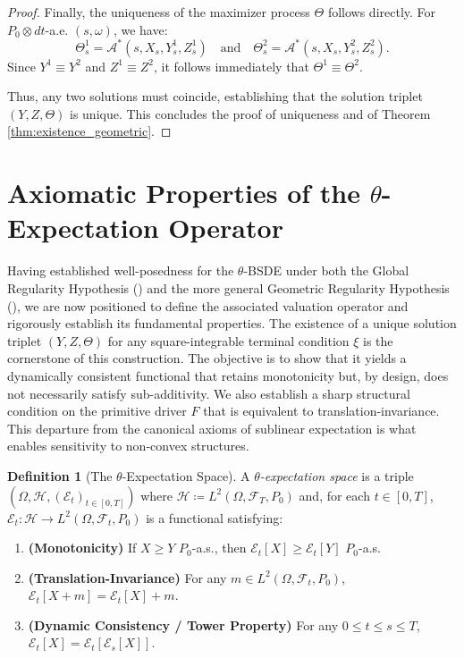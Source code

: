 \documentclass[12pt, letterpaper]{amsart}
\newcommand{\Ecal}{\mathcal{E}}
\newcommand{\Thetacal}{\mathcal{A}}
\theoremstyle{plain}
\theoremstyle{definition}
\newtheorem{definition}[theorem]{Definition}
\theoremstyle{remark}
\numberwithin{equation}{section} %
\begin{document}
\begin{proof}
Finally, the uniqueness of the maximizer process \(\Theta\) follows directly. For $P_0 \otimes dt$-a.e. $(s,\omega)$, we have:
\[ \Theta^1_s = \Thetacal^*(s,X_s,Y^1_s,Z^1_s) \quad \text{and} \quad \Theta^2_s = \Thetacal^*(s,X_s,Y^2_s,Z^2_s). \]
Since $Y^1 \equiv Y^2$ and $Z^1 \equiv Z^2$, it follows immediately that $\Theta^1 \equiv \Theta^2$.

Thus, any two solutions must coincide, establishing that the solution triplet \((Y, Z, \Theta)\) is unique. This concludes the proof of uniqueness and of Theorem \ref{thm:existence_geometric}.

\end{proof}

\section{Axiomatic Properties of the \texorpdfstring{$\theta$}{theta}-Expectation Operator}\label{sec:axiomatic_space}


Having established well-posedness for the $\theta$-BSDE under both the Global Regularity Hypothesis () and the more general Geometric Regularity Hypothesis (), we are now positioned to define the associated valuation operator and rigorously establish its fundamental properties. The existence of a unique solution triplet $(Y, Z, \Theta)$ for any square-integrable terminal condition $\xi$ is the cornerstone of this construction. The objective is to show that it yields a dynamically consistent functional that retains monotonicity but, by design, does not necessarily satisfy sub-additivity. We also establish a sharp structural condition on the primitive driver $F$ that is equivalent to translation-invariance. This departure from the canonical axioms of sublinear expectation is what enables sensitivity to non-convex structures.


\begin{definition}[The $\theta$-Expectation Space]
\label{def:theta_expectation_space}
A \emph{$\theta$-expectation space} is a triple $(\Omega, \mathcal{H}, (\Ecal_t)_{t\in[0,T]})$ where $\mathcal{H} \coloneqq L^2(\Omega, \mathcal{F}_T, P_0)$ and, for each $t \in [0,T]$, $\Ecal_t: \mathcal{H} \to L^2(\Omega, \mathcal{F}_t, P_0)$ is a functional satisfying:
\begin{enumerate}[label=(A\arabic*)]
    \item \textbf{(Monotonicity)} If $X \ge Y$ $P_0$-a.s., then $\Ecal_t[X] \ge \Ecal_t[Y]$ $P_0$-a.s.
    \item \textbf{(Translation-Invariance)} For any $m \in L^2(\Omega, \mathcal{F}_t, P_0)$, $\Ecal_t[X + m] = \Ecal_t[X] + m$.
    \item \textbf{(Dynamic Consistency / Tower Property)} For any $0 \le t \le s \le T$, $\Ecal_t[X] = \Ecal_t\left[\Ecal_s[X]\right]$.
\end{enumerate}
\end{definition}
\end{document}
